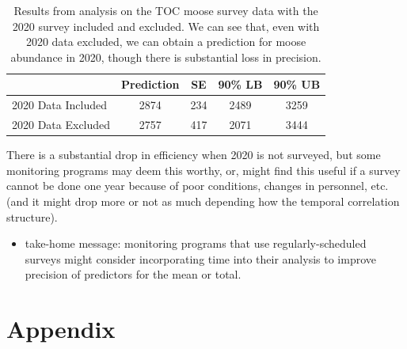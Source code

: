 \documentclass[]{interact}
\theoremstyle{plain}%
\theoremstyle{definition}
\theoremstyle{remark}
\providecommand{\tightlist}{%
  \setlength{\itemsep}{0pt}\setlength{\parskip}{0pt}}
\def\tightlist{}
\begin{document}
\begin{table}[H]

\caption{\label{tab:forecast}Results from analysis on the TOC moose survey data with the 2020 survey included and excluded. We can see that, even with 2020 data excluded, we can obtain a prediction for moose abundance in 2020, though there is substantial loss in precision.}
\centering
\begin{tabular}[t]{lcccc}
\toprule
  & Prediction & SE & 90\% LB & 90\% UB\\
\midrule
2020 Data Included & 2874 & 234 & 2489 & 3259\\
2020 Data Excluded & 2757 & 417 & 2071 & 3444\\
\bottomrule
\end{tabular}
\end{table}

There is a substantial drop in efficiency when 2020 is not surveyed, but
some monitoring programs may deem this worthy, or, might find this
useful if a survey cannot be done one year because of poor conditions,
changes in personnel, etc. (and it might drop more or not as much
depending how the temporal correlation structure).

\begin{itemize}
\tightlist
\item
  take-home message: monitoring programs that use regularly-scheduled
  surveys might consider incorporating time into their analysis to
  improve precision of predictors for the mean or total.
\end{itemize}

\section{Appendix} \label{section:appendix}
\end{document}
